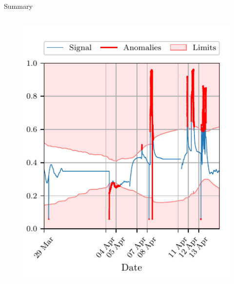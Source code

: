 \documentclass[aspectratio=169]{beamer}
\makeatletter
\def\beamer@writeslidentry@miniframesoff{%
  \expandafter\beamer@ifempty\expandafter{\beamer@framestartpage}{}%
  {%
    \clearpage\beamer@notesactions%
  }
}
\newcommand*{\miniframesoff}{\let\beamer@writeslidentry=\beamer@writeslidentry@miniframesoff}
\makeatother
\begin{document}
\begin{frame}{Summary}
\begin{columns}
\begin{column}{0.35\linewidth}
\begin{figure}[htpb]
\begin{center}
                    \includegraphics[width=\linewidth]{../ilustrate/pc2023/inverter/half_Inverter_Temperature_sliding_thresh.pdf}
                \end{center}
            \end{figure}
        \end{column}
    \end{columns}

\end{frame}

\miniframesoff
\section{}
\end{document}
